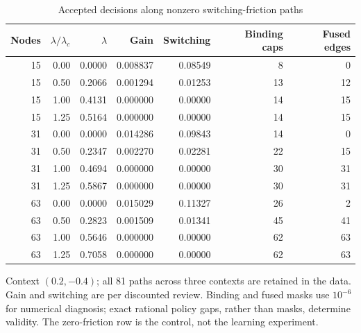 \begin{table}[t]
\centering\small
\caption{Accepted decisions along nonzero switching-friction paths}\label{tab:r13-friction}
\begin{tabular}{rrrrrrr}\toprule
Nodes & $\lambda/\lambda_c$ & $\lambda$ & Gain & Switching & Binding caps & Fused edges \\\midrule
15 & 0.00 & 0.0000 & 0.008837 & 0.08549 & 8 & 0 \\
15 & 0.50 & 0.2066 & 0.001294 & 0.01253 & 13 & 12 \\
15 & 1.00 & 0.4131 & 0.000000 & 0.00000 & 14 & 15 \\
15 & 1.25 & 0.5164 & 0.000000 & 0.00000 & 14 & 15 \\
31 & 0.00 & 0.0000 & 0.014286 & 0.09843 & 14 & 0 \\
31 & 0.50 & 0.2347 & 0.002270 & 0.02281 & 22 & 15 \\
31 & 1.00 & 0.4694 & 0.000000 & 0.00000 & 30 & 31 \\
31 & 1.25 & 0.5867 & 0.000000 & 0.00000 & 30 & 31 \\
63 & 0.00 & 0.0000 & 0.015029 & 0.11327 & 26 & 2 \\
63 & 0.50 & 0.2823 & 0.001509 & 0.01341 & 45 & 41 \\
63 & 1.00 & 0.5646 & 0.000000 & 0.00000 & 62 & 63 \\
63 & 1.25 & 0.7058 & 0.000000 & 0.00000 & 62 & 63 \\
\bottomrule\end{tabular}
\par\smallskip\begin{minipage}{.96\textwidth}\footnotesize Context $(0.2,-0.4)$; all 81 paths across three contexts are retained in the data. Gain and switching are per discounted review. Binding and fused masks use $10^{-6}$ for numerical diagnosis; exact rational policy gaps, rather than masks, determine validity. The zero-friction row is the control, not the learning experiment.\end{minipage}
\end{table}
